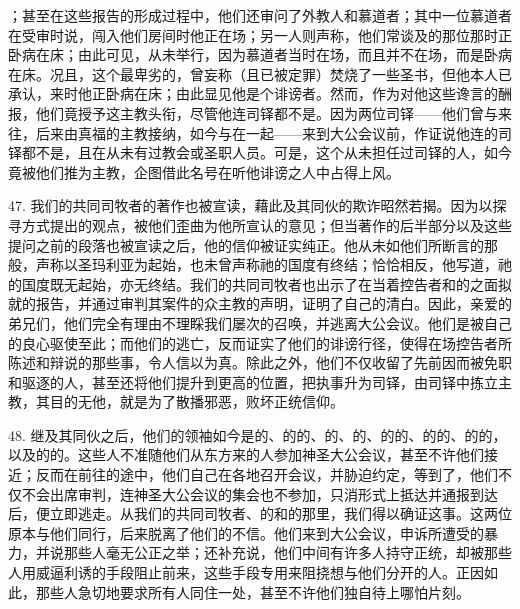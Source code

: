 ；甚至在这些报告的形成过程中，他们还审问了外教人和慕道者；其中一位慕道者在受审时说，闯入他们房间时他正在场；另一人则声称，他们常谈及的那位那时正卧病在床；由此可见，从未举行，因为慕道者当时在场，而且并不在场，而是卧病在床。况且，这个最卑劣的，曾妄称（且已被定罪）焚烧了一些圣书，但他本人已承认，来时他正卧病在床；由此显见他是个诽谤者。然而，作为对他这些谗言的酬报，他们竟授予这主教头衔，尽管他连司铎都不是。因为两位司铎——他们曾与来往，后来由真福的主教接纳，如今与在一起——来到大公会议前，作证说他连的司铎都不是，且在从未有过教会或圣职人员。可是，这个从未担任过司铎的人，如今竟被他们推为主教，企图借此名号在听他诽谤之人中占得上风。\par

47. 我们的共同司牧者的著作也被宣读，藉此及其同伙的欺诈昭然若揭。因为以探寻方式提出的观点，被他们歪曲为他所宣认的意见；但当著作的后半部分以及这些提问之前的段落也被宣读之后，他的信仰被证实纯正。他从未如他们所断言的那般，声称以圣玛利亚为起始，也未曾声称祂的国度有终结；恰恰相反，他写道，祂的国度既无起始，亦无终结。我们的共同司牧者也出示了在当着控告者和的之面拟就的报告，并通过审判其案件的众主教的声明，证明了自己的清白。因此，亲爱的弟兄们，他们完全有理由不理睬我们屡次的召唤，并逃离大公会议。他们是被自己的良心驱使至此；而他们的逃亡，反而证实了他们的诽谤行径，使得在场控告者所陈述和辩说的那些事，令人信以为真。除此之外，他们不仅收留了先前因而被免职和驱逐的人，甚至还将他们提升到更高的位置，把执事升为司铎，由司铎中拣立主教，其目的无他，就是为了散播邪恶，败坏正统信仰。\par

48. 继及其同伙之后，他们的领袖如今是的、的的、的、的、的的、的的、的的，以及的的。这些人不准随他们从东方来的人参加神圣大公会议，甚至不许他们接近；反而在前往的途中，他们自己在各地召开会议，并胁迫约定，等到了，他们不仅不会出席审判，连神圣大公会议的集会也不参加，只消形式上抵达并通报到达后，便立即逃走。从我们的共同司牧者、的和的那里，我们得以确证这事。这两位原本与他们同行，后来脱离了他们的不信。他们来到大公会议，申诉所遭受的暴力，并说那些人毫无公正之举；还补充说，他们中间有许多人持守正统，却被那些人用威逼利诱的手段阻止前来，这些手段专用来阻挠想与他们分开的人。正因如此，那些人急切地要求所有人同住一处，甚至不许他们独自待上哪怕片刻。\par

